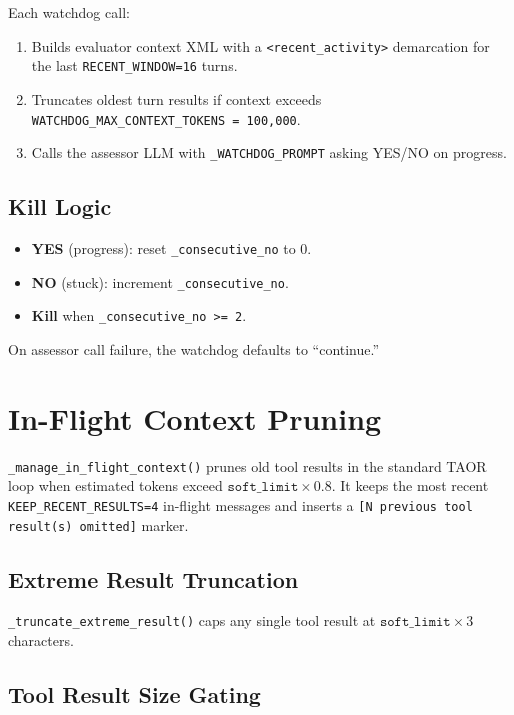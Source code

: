 \documentclass[11pt,letterpaper]{report}
\newcommand{\code}[1]{\texttt{#1}}
\begin{document}
Each watchdog call:

\begin{enumerate}[nosep]
  \item Builds evaluator context XML with a \code{<recent\_activity>}
        demarcation for the last \code{RECENT\_WINDOW=16} turns.
  \item Truncates oldest turn results if context exceeds
        \code{WATCHDOG\_MAX\_CONTEXT\_TOKENS = 100{,}000}.
  \item Calls the assessor LLM with \code{\_WATCHDOG\_PROMPT}
        asking YES/NO on progress.
\end{enumerate}

\subsection{Kill Logic}

\begin{itemize}[nosep]
  \item \textbf{YES} (progress): reset \code{\_consecutive\_no} to 0.
  \item \textbf{NO} (stuck): increment \code{\_consecutive\_no}.
  \item \textbf{Kill} when \code{\_consecutive\_no >= 2}.
\end{itemize}

On assessor call failure, the watchdog defaults to ``continue.''


\section{In-Flight Context Pruning}

\code{\_manage\_in\_flight\_context()} prunes old
tool results in the standard TAOR loop when estimated tokens exceed
$\texttt{soft\_limit} \times 0.8$. It keeps the most recent
\code{KEEP\_RECENT\_RESULTS=4} in-flight messages and inserts a
\code{[N previous tool result(s) omitted]} marker.

\subsection{Extreme Result Truncation}

\code{\_truncate\_extreme\_result()} caps any single
tool result at $\texttt{soft\_limit} \times 3$ characters.

\subsection{Tool Result Size Gating}
\end{document}
